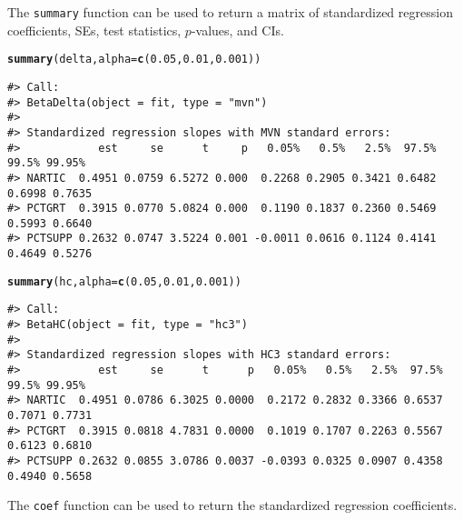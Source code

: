 \documentclass[man]{apa7}\usepackage[]{graphicx}\usepackage[]{xcolor}
\makeatletter
\newcommand{\hlnum}[1]{\textcolor[rgb]{0.686,0.059,0.569}{#1}}%
\newcommand{\hlstd}[1]{\textcolor[rgb]{0.345,0.345,0.345}{#1}}%
\newcommand{\hlkwc}[1]{\textcolor[rgb]{0.333,0.667,0.333}{#1}}%
\newcommand{\hlkwd}[1]{\textcolor[rgb]{0.737,0.353,0.396}{\textbf{#1}}}%
\newenvironment{kframe}{%
 \def\at@end@of@kframe{}%
 \ifinner\ifhmode%
  \def\at@end@of@kframe{\end{minipage}}%
  \begin{minipage}{\columnwidth}%
 \fi\fi%
 \def\FrameCommand##1{\hskip\@totalleftmargin \hskip-\fboxsep
 \colorbox{shadecolor}{##1}\hskip-\fboxsep
     \hskip-\linewidth \hskip-\@totalleftmargin \hskip\columnwidth}%
 \MakeFramed {\advance\hsize-\width
   \@totalleftmargin\z@ \linewidth\hsize
   \@setminipage}}%
 {\par\unskip\endMakeFramed%
 \at@end@of@kframe}
\newenvironment{knitrout}{}{} %
\makeatother
\begin{document}
\noindent The \texttt{summary} function can be used to return
a matrix of standardized regression coefficients,
SEs,
test statistics,
$p$-values,
and CIs.

\vspace{-.5em}
\begin{minipage}{.75\linewidth}
	\singlespacing
\begin{knitrout}\scriptsize
{}\color{fgcolor}\begin{kframe}
\begin{alltt}
\hlkwd{summary}\hlstd{(delta,} \hlkwc{alpha} \hlstd{=} \hlkwd{c}\hlstd{(}\hlnum{0.05}\hlstd{,} \hlnum{0.01}\hlstd{,} \hlnum{0.001}\hlstd{))}
\end{alltt}
\begin{verbatim}
#> Call:
#> BetaDelta(object = fit, type = "mvn")
#>
#> Standardized regression slopes with MVN standard errors:
#>            est     se      t     p   0.05%   0.5%   2.5%  97.5%  99.5% 99.95%
#> NARTIC  0.4951 0.0759 6.5272 0.000  0.2268 0.2905 0.3421 0.6482 0.6998 0.7635
#> PCTGRT  0.3915 0.0770 5.0824 0.000  0.1190 0.1837 0.2360 0.5469 0.5993 0.6640
#> PCTSUPP 0.2632 0.0747 3.5224 0.001 -0.0011 0.0616 0.1124 0.4141 0.4649 0.5276
\end{verbatim}
\begin{alltt}
\hlkwd{summary}\hlstd{(hc,} \hlkwc{alpha} \hlstd{=} \hlkwd{c}\hlstd{(}\hlnum{0.05}\hlstd{,} \hlnum{0.01}\hlstd{,} \hlnum{0.001}\hlstd{))}
\end{alltt}
\begin{verbatim}
#> Call:
#> BetaHC(object = fit, type = "hc3")
#>
#> Standardized regression slopes with HC3 standard errors:
#>            est     se      t      p   0.05%   0.5%   2.5%  97.5%  99.5% 99.95%
#> NARTIC  0.4951 0.0786 6.3025 0.0000  0.2172 0.2832 0.3366 0.6537 0.7071 0.7731
#> PCTGRT  0.3915 0.0818 4.7831 0.0000  0.1019 0.1707 0.2263 0.5567 0.6123 0.6810
#> PCTSUPP 0.2632 0.0855 3.0786 0.0037 -0.0393 0.0325 0.0907 0.4358 0.4940 0.5658
\end{verbatim}
\end{kframe}
\end{knitrout}
\end{minipage}

\noindent The \texttt{coef} function can be used to return
the standardized regression coefficients.
\end{document}
